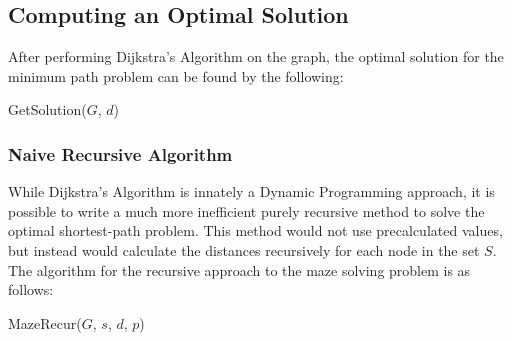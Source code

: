 \documentclass[11pt]{article}
\begin{document}
\begin{multicols}{2}
	\subsection{Computing an Optimal Solution}
	After performing Dijkstra's Algorithm on the graph, the optimal solution for the minimum path
	problem can be found by the following:
	\begin{algorithm}[H]
		\SetAlgoLined
		\SetStartEndCondition{ }{}{}%
		\AlgoDontDisplayBlockMarkers\SetAlgoNoEnd\SetAlgoNoLine%
		\caption{GetSolution(${G}$, ${d}$)\label{get-soln}}
	\end{algorithm}

	\subsubsection{Naive Recursive Algorithm}
	While Dijkstra's Algorithm is innately a Dynamic Programming approach, it is possible to write a
	much more inefficient purely recursive method to solve the optimal shortest-path problem. This
	method would not use precalculated values, but instead would calculate the distances recursively
	for each node in the set ${S}$. The algorithm for the recursive approach to the maze solving
	problem is as follows:

	\begin{algorithm}[H]
		\SetAlgoLined
		\SetStartEndCondition{ }{}{}%
		\AlgoDontDisplayBlockMarkers\SetAlgoNoEnd\SetAlgoNoLine%
		\caption{MazeRecur(${G}$, ${s}$, ${d}$, ${p}$)\label{recur}}
	\end{algorithm}


\end{multicols}
\end{document}
